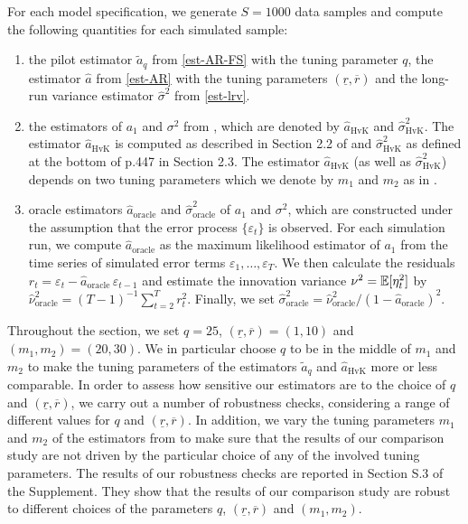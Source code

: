 For each model specification, we generate $S=1000$ data samples and compute the following quantities for each simulated sample: 
\begin{enumerate}[label=(\roman*),leftmargin=0.9cm]
\item the pilot estimator $\widetilde{a}_q$ from \eqref{est-AR-FS} with the tuning parameter $q$, the estimator $\widehat{a}$ from \eqref{est-AR} with the tuning parameters $(\underline{r},\overline{r})$ and the long-run variance estimator $\widehat{\sigma}^2$ from \eqref{est-lrv}. 
\item the estimators of $a_1$ and $\sigma^2$ from \cite{Hall2003}, which are denoted by $\widehat{a}_{\text{HvK}}$ and $\widehat{\sigma}^2_{\text{HvK}}$. The estimator $\widehat{a}_{\text{HvK}}$ is computed as described in Section 2.2 of \cite{Hall2003} and $\widehat{\sigma}^2_{\text{HvK}}$ as defined at the bottom of p.447 in Section 2.3. The estimator $\widehat{a}_{\text{HvK}}$ (as well as $\widehat{\sigma}^2_{\text{HvK}}$) depends on two tuning parameters which we denote by $m_1$ and $m_2$ as in \cite{Hall2003}. 
\item oracle estimators $\widehat{a}_{\text{oracle}}$ and $\widehat{\sigma}^2_{\text{oracle}}$ of $a_1$ and $\sigma^2$, which are constructed under the assumption that the error process $\{\varepsilon_t\}$ is observed. For each simulation run, we compute $\widehat{a}_{\text{oracle}}$ as the maximum likelihood estimator of $a_1$ from the time series of simulated error terms $\varepsilon_1,\ldots,\varepsilon_T$. We then calculate the residuals $r_t = \varepsilon_t - \widehat{a}_{\text{oracle}} \, \varepsilon_{t-1}$ and estimate the innovation variance $\nu^2 = \mathbb{E}[\eta_t^2]$ by $\widehat{\nu}_{\text{oracle}}^2 = (T-1)^{-1} \sum_{t=2}^T r_t^2$. Finally, we set $\widehat{\sigma}^2_{\text{oracle}} = \widehat{\nu}_{\text{oracle}}^2 / (1 - \widehat{a}_{\text{oracle}})^2$. 
\end{enumerate}
Throughout the section, we set $q = 25$, $(\underline{r},\overline{r}) = (1,10)$ and $(m_1,m_2) = (20,30)$. We in particular choose $q$ to be in the middle of $m_1$ and $m_2$ to make the tuning parameters of the estimators $\widetilde{a}_q$ and $\widehat{a}_{\text{HvK}}$ more or less comparable. In order to assess how sensitive our estimators are to the choice of $q$ and $(\underline{r}, \overline{r})$, we carry out a number of robustness checks, considering a range of different values for $q$ and $(\underline{r},\overline{r})$. In addition, we vary the tuning parameters $m_1$ and $m_2$ of the estimators from \cite{Hall2003} to make sure that the results of our comparison study are not driven by the particular choice of any of the involved tuning parameters. The results of our robustness checks are reported in Section S.3 of the Supplement. They show that the results of our comparison study are robust to different choices of the parameters $q$, $(\underline{r},\overline{r})$ and $(m_1,m_2)$. 


